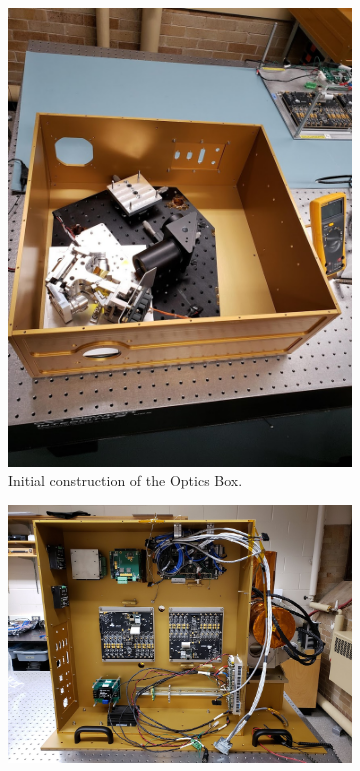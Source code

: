 \begin{figure}
    \centering
    \begin{subfigure}[h]{0.4\textwidth}
        \centering
        \includegraphics[width=\textwidth]{chap3_images/Optics_during_construction.jpg}
        \caption{Initial construction of the Optics Box.}
        \label{fig:OB_construction}
    \end{subfigure}
    \begin{subfigure}[h]{0.4\textwidth}
        \centering
        \includegraphics[width=\textwidth]{chap3_images/ebox_during_construction.jpg}

\end{subfigure}
\end{figure}
